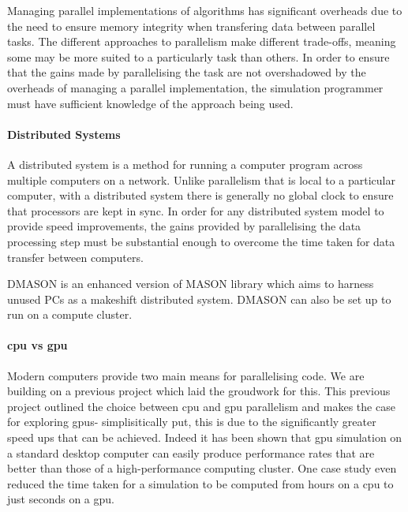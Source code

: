 \documentclass{UoYCSproject}
\begin{document}
Managing parallel implementations of algorithms has significant overheads due to the need to ensure memory integrity when transfering data between parallel tasks.
The different approaches to parallelism make different trade-offs, meaning some may be more suited to a particularly task than others.
In order to ensure that the gains made by parallelising the task are not overshadowed by the overheads of managing a parallel implementation, the simulation programmer must have sufficient knowledge of the approach being used.

\paragraph{Distributed Systems}
A distributed system is a method for running a computer program across multiple computers on a network.
Unlike parallelism that is local to a particular computer, with a distributed system there is generally no global clock to ensure that processors are kept in sync.
In order for any distributed system model to provide speed improvements, the gains provided by parallelising the data processing step must be substantial enough to overcome the time taken for data transfer between computers.

DMASON is an enhanced version of \gls{MASON} library which aims to harness unused PCs as a makeshift distributed system.
DMASON can also be set up to run on a compute cluster.

\paragraph{\acrshort{cpu} vs \acrshort{gpu}}
\label{cpu_v_gpu}
Modern computers provide two main means for parallelising code.
We are building on a previous project\cite{phil_diss} which laid the groudwork for this.
This previous project outlined the choice between \acrshort{cpu} and \acrshort{gpu} parallelism and makes the case for exploring \acrshort{gpu}s- simplisitically put, this is due to the significantly greater speed ups that can be achieved.
Indeed it has been shown that \acrshort{gpu} simulation on a standard desktop computer can easily produce performance rates that are better than those of a high-performance computing cluster\cite{flame_simulation}.
One case study even reduced the time taken for a simulation to be computed from hours on a \acrshort{cpu} to just seconds on a \acrshort{gpu}\cite{flame_keratinocyte}.
\end{document}

